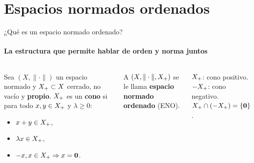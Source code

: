 \section{Espacios normados ordenados}

\begin{frame}{¿Qué es un espacio normado ordenado?}
\framesubtitle{La estructura que permite hablar de orden y norma juntos}

\begin{columns}
    \begin{definition}
    Sea $(X,\|\cdot\|)$ un espacio normado y $X_{+}\subset X$
    cerrado, no vacío y \textbf{propio}.
    $X_{+}$ es un \textbf{cono} si para todo $x,y\in X_{+}$ y $\lambda\ge 0$:
    \begin{itemize}
        \item $x+y\in X_{+}$,
        \item $\lambda x\in X_{+}$,
        \item $-x,x\in X_{+}\Rightarrow x=\mathbf{0}$.
    \end{itemize}
    \end{definition}

    A $(X,\|\cdot\|,X_{+})$ se le llama
    \textbf{espacio normado ordenado} (ENO).


    \smallskip
    \textcolor{blue}{$X_{+}$}: cono positivo. \quad
    \textcolor{red}{$-X_{+}$}: cono negativo. \\[2pt]
    $X_{+}\cap(-X_{+})=\{\mathbf{0}\}$.
\end{columns}

\end{frame}


